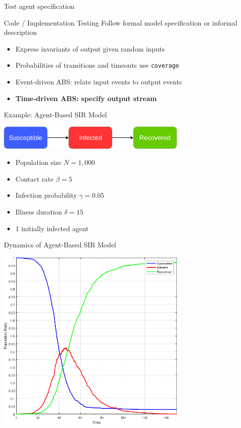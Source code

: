 \documentclass{beamer} %
\begin{document}
\begin{frame}{Test agent specification}
\begin{block}{Code / Implementation Testing}
Follow formal model specification or informal description
\end{block}

\begin{block}{}
  \begin{itemize}
  	\item Express invariants of output given random inputs
  	\item Probabilities of transitions and timeouts use \texttt{coverage}
    \item Event-driven ABS: relate input events to output events 
    \item \textbf{Time-driven ABS: specify output stream}
  \end{itemize}
\end{block}
\end{frame}

\begin{frame}{Example: Agent-Based SIR Model}
\begin{center}
\includegraphics[width=0.7\textwidth]{./fig/SIR_transitions.png}
\end{center}
  \begin{itemize}
    \item Population size $N = 1,000$
 	\item Contact rate $\beta = 5$
 	\item Infection probability $\gamma = 0.05$
 	\item Illness duration $\delta = 15$
 	\item 1 initially infected agent
  \end{itemize}
\end{frame}

\begin{frame}{Dynamics of Agent-Based SIR Model}
\begin{center}
\includegraphics[width=0.7\textwidth]{./fig/SIR_Yampa_dt001.png}
\end{center}
\end{frame}
\end{document}
